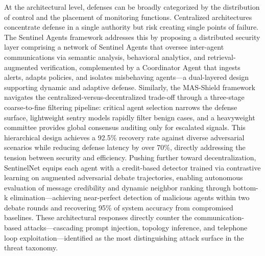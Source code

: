 \documentclass[11pt]{article}
\begin{document}
At the architectural level, defenses can be broadly categorized by the distribution of control and the placement of monitoring functions. Centralized architectures concentrate defense in a single authority but risk creating single points of failure. The Sentinel Agents framework \cite{ref423} addresses this by proposing a distributed security layer comprising a network of Sentinel Agents that oversee inter-agent communications via semantic analysis, behavioral analytics, and retrieval-augmented verification, complemented by a Coordinator Agent that ingests alerts, adapts policies, and isolates misbehaving agents---a dual-layered design supporting dynamic and adaptive defense. Similarly, the MAS-Shield framework \cite{ref424} navigates the centralized-versus-decentralized trade-off through a three-stage coarse-to-fine filtering pipeline: critical agent selection narrows the defense surface, lightweight sentry models rapidly filter benign cases, and a heavyweight committee provides global consensus auditing only for escalated signals. This hierarchical design achieves a 92.5\% recovery rate against diverse adversarial scenarios while reducing defense latency by over 70\%, directly addressing the tension between security and efficiency. Pushing further toward decentralization, SentinelNet \cite{ref425} equips each agent with a credit-based detector trained via contrastive learning on augmented adversarial debate trajectories, enabling autonomous evaluation of message credibility and dynamic neighbor ranking through bottom-k elimination---achieving near-perfect detection of malicious agents within two debate rounds and recovering 95\% of system accuracy from compromised baselines. These architectural responses directly counter the communication-based attacks---cascading prompt injection, topology inference, and telephone loop exploitation---identified as the most distinguishing attack surface in the threat taxonomy.
\end{document}
